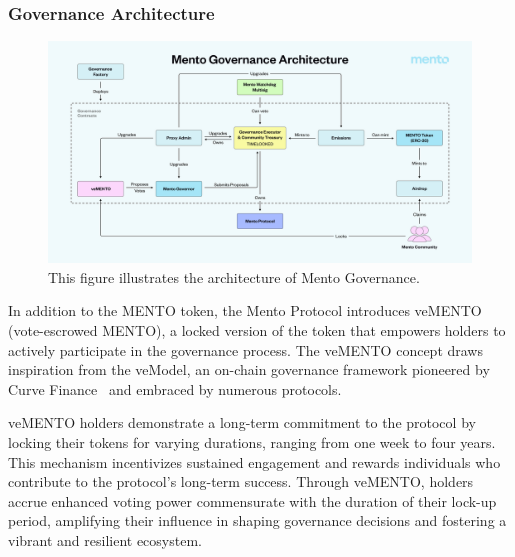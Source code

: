 \documentclass[a4paper]{article}
\theoremstyle{definition}
\begin{document}
\subsubsection{Governance Architecture}
\begin{figure}[ht]
    \centering
    \includegraphics[width=1\linewidth]{figures/mento_governance.png}
    \caption{This figure illustrates the architecture of Mento Governance.}
    \label{fig:mento_governance}
\end{figure}
In addition to the MENTO token, the Mento Protocol introduces veMENTO (vote-escrowed MENTO), a locked version of the token that empowers holders to actively participate in the governance process. The veMENTO concept draws inspiration from the veModel, an on-chain governance framework pioneered by Curve Finance~\cite{curve_vemodel} and embraced by numerous protocols.

veMENTO holders demonstrate a long-term commitment to the protocol by locking their tokens for varying durations, ranging from one week to four years. This mechanism incentivizes sustained engagement and rewards individuals who contribute to the protocol's long-term success. Through veMENTO, holders accrue enhanced voting power commensurate with the duration of their lock-up period, amplifying their influence in shaping governance decisions and fostering a vibrant and resilient ecosystem.
\end{document}
